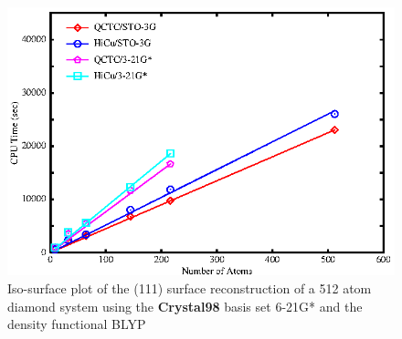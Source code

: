 \documentclass[prb,aps,nobibnotes,twocolumn,doublespace,twocolumngrid,superbib]{revtex4}
\begin{document}
\begin{figure}

\caption{\label{figure:Dense64diamond} Iso-surface plot of the (111) surface reconstruction 
of a 512 atom diamond system using the  {\bf Crystal98} basis set 6-21G* \cite{C98Basis} and the 
density functional BLYP \cite{Becke92} }

{\centering \includegraphics{Timing_sto3g_321g.ps} \par}
\end{figure}
%
%
%
\end{document}
